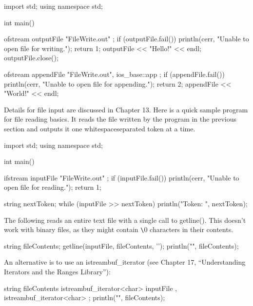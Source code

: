 \begin{cpp}
import std;
using namespace std;

int main()
{
    ofstream outputFile { "FileWrite.out" };
    if (outputFile.fail()) {
        println(cerr, "Unable to open file for writing.");
        return 1;
    }
    outputFile << "Hello!" << endl;
    outputFile.close();

    ofstream appendFile { "FileWrite.out", ios_base::app };
    if (appendFile.fail()) {
        println(cerr, "Unable to open file for appending.");
        return 2;
    }
    appendFile << "World!" << endl;
}
\end{cpp}


Details for file input are discussed in Chapter 13. Here is a quick sample program for file reading basics. It reads the file written by the program in the previous section and outputs it one whitespaceseparated token at a time.

\begin{cpp}
import std;
using namespace std;

int main()
{
    ifstream inputFile { "FileWrite.out" };
    if (inputFile.fail()) {
        println(cerr, "Unable to open file for reading.");
        return 1;
    }

    string nextToken;
    while (inputFile >> nextToken) {
        println("Token: {}", nextToken);
    }
}
\end{cpp}

The following reads an entire text file with a single call to getline(). This doesn’t work with binary files, as they might contain \verb|\|0 characters in their contents.

\begin{cpp}
string fileContents;
getline(inputFile, fileContents, '\0');
println("{}", fileContents);
\end{cpp}

An alternative is to use an istreambuf\_iterator (see Chapter 17, “Understanding Iterators and the Ranges Library”):

\begin{cpp}
string fileContents {
    istreambuf_iterator<char> { inputFile },
    istreambuf_iterator<char> { }
};
println("{}", fileContents);
\end{cpp}













